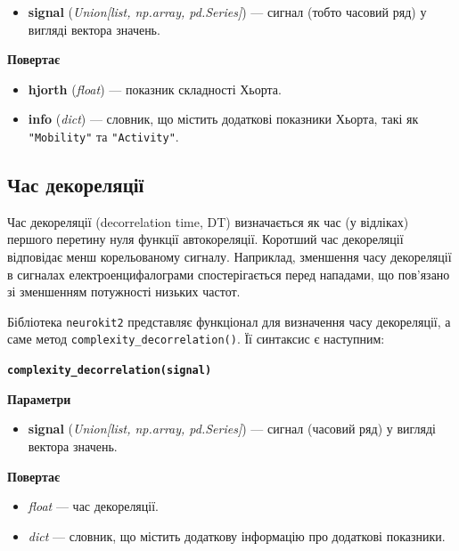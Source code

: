 \documentclass[
  letterpaper,
]{report}
\providecommand{\tightlist}{%
  \setlength{\itemsep}{0pt}\setlength{\parskip}{0pt}}\usepackage{longtable,booktabs,array}
\begin{document}
\begin{itemize}
\tightlist
\item
  \textbf{signal} (\emph{Union{[}list, np.array, pd.Series{]}}) ---
  сигнал (тобто часовий ряд) у вигляді вектора значень.
\end{itemize}

\textbf{Повертає}

\begin{itemize}
\tightlist
\item
  \textbf{hjorth} (\emph{float}) --- показник складності Хьорта.
\item
  \textbf{info} (\emph{dict}) --- словник, що містить додаткові
  показники Хьорта, такі як \texttt{"Mobility"} та \texttt{"Activity"}.
\end{itemize}

\hypertarget{ux447ux430ux441-ux434ux435ux43aux43eux440ux435ux43bux44fux446ux456ux457}{%
\subsection{Час
декореляції}\label{ux447ux430ux441-ux434ux435ux43aux43eux440ux435ux43bux44fux446ux456ux457}}

Час декореляції (decorrelation time, DT) визначається як час (у
відліках) першого перетину нуля функції автокореляції. Коротший час
декореляції відповідає менш корельованому сигналу. Наприклад, зменшення
часу декореляції в сигналах електроенцифалограми спостерігається перед
нападами, що пов'язано зі зменшенням потужності низьких частот.

Бібліотека \texttt{neurokit2} представляє функціонал для визначення часу
декореляції, а саме метод \texttt{complexity\_decorrelation()}. Її
синтаксис є наступним:

\textbf{\texttt{complexity\_decorrelation(signal)}}

\textbf{Параметри}

\begin{itemize}
\tightlist
\item
  \textbf{signal} (\emph{Union{[}list, np.array, pd.Series{]}}) ---
  сигнал (часовий ряд) у вигляді вектора значень.
\end{itemize}

\textbf{Повертає}

\begin{itemize}
\tightlist
\item
  \emph{float} --- час декореляції.
\item
  \emph{dict} --- словник, що містить додаткову інформацію про додаткові
  показники.
\end{itemize}
\end{document}
